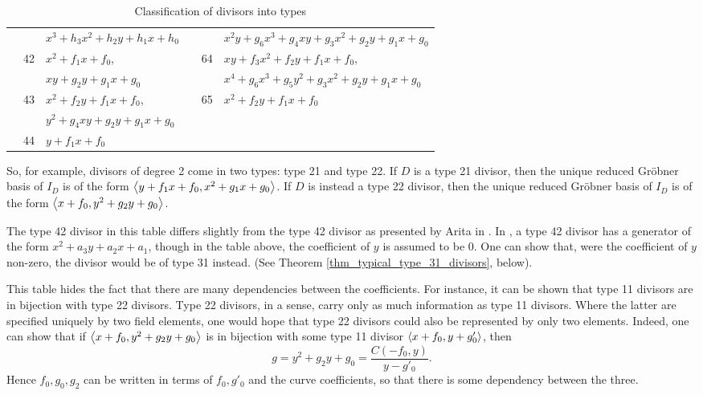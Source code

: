 \begin{table}[hb]
\begin{center}
\begin{tabular}{l|l|l||l|l|l}
    & & $x^3 + h_3x^2 + h_2y + h_1x + h_0$ & & & $x^2y + g_6x^3 + g_4xy + g_3x^2 + g_2y + g_1x + g_0$ \\
    \cline{2-3}\cline{5-6}
    &\multirow{2}{*}{42} & $x^2 + f_1x + f_0$, & &\multirow{2}{*}{64} & $xy + f_3x^2 + f_2y + f_1x + f_0$, \\
    & & $xy + g_2y + g_1x + g_0$ & & & $x^4 + g_6x^3 + g_5y^2 + g_3x^2 + g_2y + g_1x + g_0$ \\
    \cline{2-3}\cline{5-6}
    &\multirow{2}{*}{43} & $x^2 + f_2y + f_1x + f_0$, & &\multirow{1}{*}{65} & $x^2 + f_2y + f_1x + f_0$ \\
    \cline{4-6}
    & & $y^2 + g_4xy + g_2y + g_1x + g_0$ \\
    \cline{2-3}
    &\multirow{1}{*}{44}
      & $y + f_1x + f_0$
\end{tabular}
\end{center}
\caption{Classification of divisors into types}
\end{table}

So, for example, divisors of degree 2 come in two types: type 21 and type 22.
If $D$ is a type 21 divisor,
then the unique reduced Gr\"obner basis of $I_D$ is of the form $\left\langle y + f_1x + f_0, x^2 + g_1x + g_0 \right\rangle$.
If $D$ is instead a type 22 divisor,
then the unique reduced Gr\"obner basis of $I_D$ is of the form $\left\langle x + f_0, y^2 + g_2y + g_0 \right\rangle$.

The type 42 divisor in this table differs slightly from the type 42 divisor as presented by Arita in \cite{arita05-2}.
In \cite{arita05-2}, a type 42 divisor has a generator of the form $x^2 + a_3y + a_2x + a_1$,
though in the table above, the coefficient of $y$ is assumed to be 0.
One can show that, were the coefficient of $y$ non-zero, the divisor would be of type 31 instead.
(See Theorem \ref{thm_typical_type_31_divisors}, below).

This table hides the fact that there are many dependencies between the coefficients.
For instance, it can be shown that type 11 divisors are in bijection with type 22 divisors.
Type 22 divisors, in a sense, carry only as much information as type 11 divisors.
Where the latter are specified uniquely by two field elements,
one would hope that type 22 divisors could also be represented by only two elements.
Indeed, one can show that if $\left\langle x + f_0, y^2 + g_2y + g_0 \right\rangle$
is in bijection with some type 11 divisor $\left\langle x + f_0, y + g'_0 \right\rangle$, then
  \[ g = y^2 + g_2y + g_0 = \frac {C(-f_0, y)}{y - g'_0}. \]
Hence $f_0, g_0, g_2$ can be written in terms of $f_0, g'_0$ and the curve coefficients,
so that there is some dependency between the three.

